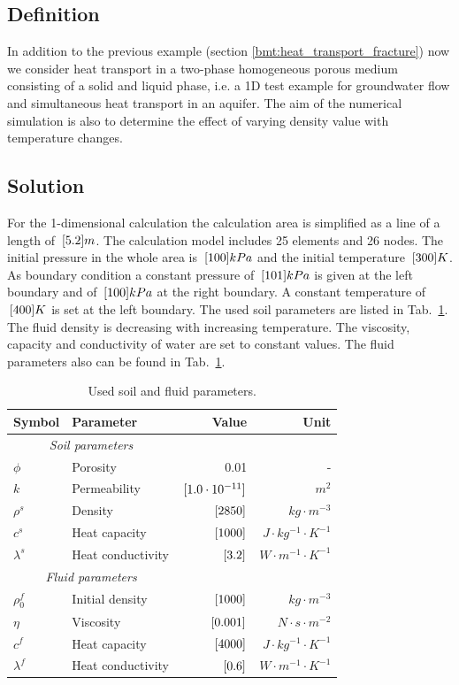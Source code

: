 \subsection{Definition}

In addition to the previous example (section \ref{bmt:heat_transport_fracture}) now we consider heat transport in a two-phase homogeneous porous medium consisting of a solid and liquid phase, i.e. a 1D test example for groundwater flow and simultaneous heat transport in an aquifer. The aim of the numerical simulation is also to determine the effect of varying density value with temperature changes. 
%

\subsection{Solution}

For the 1-dimensional calculation the calculation area is simplified as a line of a length of $\, \mathrm{[}5.2]{m}$. The calculation model includes 25 elements and 26 nodes. The initial pressure in the whole area is $\, \mathrm{[}100]{kPa}$ and the initial temperature $\, \mathrm{[}300]{K}$. As boundary condition a constant pressure of $\, \mathrm{[}101]{kPa}$ is given at the left boundary and of $\, \mathrm{[}100]{kPa}$ at the right boundary. A constant temperature of $\, \mathrm{[}400]{K}$ is set at the left boundary. The used soil parameters are listed in Tab.~\ref{tab41}. The fluid density is decreasing with increasing temperature. The viscosity, capacity and conductivity of water are set to constant values. The fluid parameters also can be found in Tab.~\ref{tab41}.

\begin{table}[htbp]
\caption{\label{tab41}Used soil and fluid parameters.}
\begin{center}
\begin{tabular}{llrr}
\toprule
Symbol & Parameter & Value & Unit \\
\midrule
\multicolumn{2}{c}{\textit{Soil parameters}}\\
$\phi$ & Porosity & 0.01 & - \\	
$k$ & Permeability & $\, \mathrm{[}1.0 \cdot 10^{-11}]{}$ & ${m^{2}}$ \\
$\rho^s$ & Density & $\, \mathrm{[}2850]{}$ & ${kg \cdot m^{-3}}$ \\
$c^s$ & Heat capacity	& $\, \mathrm{[}1000]{}$ & ${J \cdot kg^{-1} \cdot K^{-1}}$ \\
$\lambda^s$	& Heat conductivity & $\, \mathrm{[}3.2]{}$ & ${W \cdot m^{-1} \cdot K^{-1}}$ \\
\cmidrule{1-2}
\multicolumn{2}{c}{\textit{Fluid parameters}}\\
$\rho^f_0$ & Initial density & $\, \mathrm{[}1000]{}$ & ${kg \cdot m^{-3}}$ \\
$\eta$ & Viscosity & $\, \mathrm{[}0.001]{}$ & ${N \cdot s \cdot m^{-2}}$ \\
$c^f$ & Heat capacity	& $\, \mathrm{[}4000]{}$ & ${J \cdot kg^{-1} \cdot K^{-1}}$ \\
$\lambda^f$	& Heat conductivity & $\, \mathrm{[}0.6]{}$ & ${W \cdot m^{-1} \cdot K^{-1}}$ \\
\bottomrule
\end{tabular}
\end{center}
\end{table}

